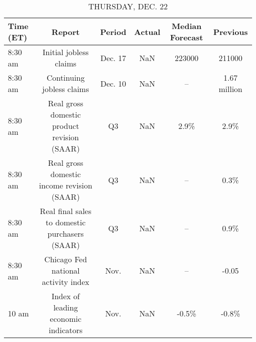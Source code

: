 \documentclass{article}%
\begin{document}
%


\begin{table}[htbp]%
\caption{THURSDAY, DEC. 22}%
\centering%
\begin{adjustbox}{width=1\textwidth}%
\begin{tabular}{lccccc}
\toprule
Time (ET) &                                         Report &  Period & Actual & Median Forecast &     Previous \\
\midrule
  8:30 am &                         Initial jobless claims & Dec. 17 &    NaN &          223000 &       211000 \\
  8:30 am &                      Continuing jobless claims & Dec. 10 &    NaN &              -- & 1.67 million \\
  8:30 am &    Real gross domestic product revision (SAAR) &      Q3 &    NaN &            2.9\% &         2.9\% \\
  8:30 am &     Real gross domestic income revision (SAAR) &      Q3 &    NaN &              -- &         0.3\% \\
  8:30 am & Real final sales to domestic purchasers (SAAR) &      Q3 &    NaN &              -- &         0.9\% \\
  8:30 am &            Chicago Fed national activity index &    Nov. &    NaN &              -- &        -0.05 \\
    10 am &           Index of leading economic indicators &    Nov. &    NaN &           -0.5\% &        -0.8\% \\
\bottomrule
\end{tabular}
%
\end{adjustbox}%
\end{table}

%
\end{document}
